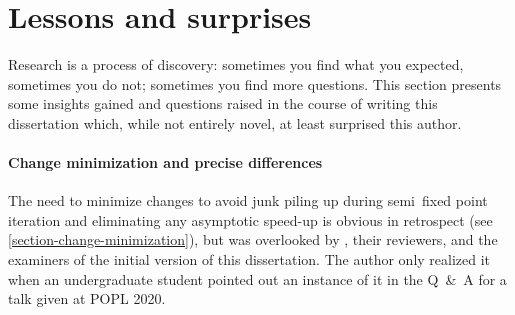 


  




\section{Lessons and surprises}

Research is a process of discovery: sometimes you find what you expected,
sometimes you do not; sometimes you find more questions. This section presents
some insights gained and questions raised in the course of writing this
dissertation which, while not entirely novel, at least surprised this author.

\paragraph{Change minimization and precise differences}

The need to minimize changes to avoid junk piling up during semi\naive\ fixed
point iteration and eliminating any asymptotic speed-up is obvious in retrospect
(see \cref{section-change-minimization}), but was overlooked by
\cite{seminaive-datafun}, their reviewers, and the examiners of the initial
version of this dissertation. The author only realized it when an undergraduate
student pointed out an instance of it in the Q~\&~A for a talk given at POPL
2020.

